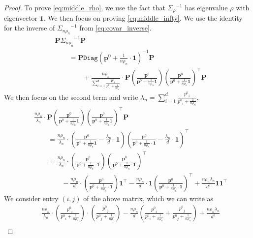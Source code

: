 \documentclass[twoside,letterpaper]{article} \usepackage{aistats2017}
\theoremstyle{definition}
\theoremstyle{remark}
\begin{document}
\begin{proof}
To prove \eqref{eq:middle_rho}, we use the fact that ${{\Sigma}_{{\rho}}}^{-1}$ has eigenvalue $\rho$ with eigenvector ${\pmb{1}}$.  We then focus on proving \eqref{eq:middle_infty}.  We use the identity for the inverse of ${{\Sigma}_{{n\rho_n}}}^{-1}$ from \eqref{eq:covar_inverse}.  
\begin{align*}
& {\pmb{P}} {{\Sigma}_{{n \rho_n }}}^{-1} {\pmb{P}} \\
&\qquad  = {\pmb{P}} {\ensuremath{\mathtt{Diag}}}({{\mathbf{p}}^0} + \frac{1}{n\rho_n} \cdot {\pmb{1}})^{-1}{\pmb{P}} \\
& \qquad \qquad  + \frac{n \rho_n}{\sum_{i=1}^d \frac{{p^0}_i}{{p^0}_i + \frac{1}{n\rho_n}}} \cdot {\pmb{P}} \left( \frac{{\mathbf{p}}^0}{{{\mathbf{p}}^0} + \frac{1}{n\rho_n}{\pmb{1}}}\right)\left( \frac{{\mathbf{p}}^0}{{{\mathbf{p}}^0} + \frac{1}{n\rho_n}{\pmb{1}}}\right)^\intercal {\pmb{P}}
\end{align*}
We then focus on the second term and write $\lambda_n = \sum_{i=1}^d \frac{{p^0}_i}{{p^0}_i + \frac{1}{n\rho_n}}$.
\begin{align*}
& \frac{n \rho_n}{\lambda_n}\cdot {\pmb{P}} \left( \frac{{\mathbf{p}}^0}{{{\mathbf{p}}^0} + \frac{1}{n\rho_n}{\pmb{1}}}\right)\left( \frac{{\mathbf{p}}^0}{{{\mathbf{p}}^0} + \frac{1}{n\rho_n}{\pmb{1}}}\right)^\intercal {\pmb{P}}\\
&\qquad  = \frac{n \rho_n}{\lambda_n} \cdot  \left( \frac{{\mathbf{p}}^0}{{{\mathbf{p}}^0} + \frac{1}{n\rho_n}{\pmb{1}}} - \frac{\lambda_n}{d}\cdot  {\pmb{1}} \right)\left( \frac{{\mathbf{p}}^0}{{{\mathbf{p}}^0} + \frac{1}{n\rho_n}\cdot {\pmb{1}}} - \frac{\lambda_n}{d}\cdot {\pmb{1}} \right)^\intercal \\
& \qquad = \frac{n \rho_n}{\lambda_n} \cdot \left( \frac{{\mathbf{p}}^0}{{{\mathbf{p}}^0} + \frac{1}{n\rho_n}\cdot {\pmb{1}}} \right)\left( \frac{{\mathbf{p}}^0}{{{\mathbf{p}}^0} + \frac{1}{n\rho_n}\cdot {\pmb{1}}} \right)^\intercal \\
& \qquad \qquad - \frac{n\rho_n}{d}\cdot  \left( \frac{{\mathbf{p}}^0}{{{\mathbf{p}}^0} + \frac{1}{n\rho_n}\cdot {\pmb{1}}} \right) {\pmb{1}}^\intercal - \frac{n\rho_n}{d}\cdot {\pmb{1}} \left( \frac{{\mathbf{p}}^0}{{{\mathbf{p}}^0} + \frac{1}{n\rho_n}\cdot {\pmb{1}}} \right)^\intercal + \frac{n  \rho_n \lambda_n}{d^2} {\pmb{1}}{\pmb{1}}^\intercal
\end{align*}
We consider entry $(i,j)$ of the above matrix, which we can write as 
\begin{align*}
& \frac{n \rho_n}{\lambda_n} \cdot  \left( \frac{{p^0}_i}{{p^0}_i + \frac{1}{n\rho_n}} \right)\cdot \left( \frac{{p^0}_j}{{p^0}_j + \frac{1}{n\rho_n}} \right) - \frac{n \rho_n}{d} \left(\frac{{p^0}_i}{{p^0}_i+\frac{1}{n\rho_n}} + \frac{{p^0}_j}{{p^0}_j+\frac{1}{n\rho_n}} \right) +  \frac{n \rho_n \lambda_n}{d^2}\\

\end{align*}
\end{proof}
\end{document}
